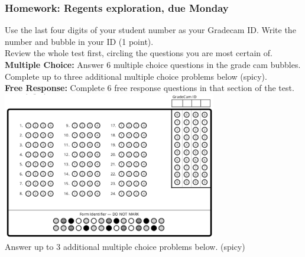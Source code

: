 \documentclass[12pt, twoside]{article}
\begin{document}
\subsubsection*{Homework: Regents exploration, due Monday}

Use the last four digits of your student number as your Gradecam ID. Write the number and bubble in your ID (1 point).\\[0.5cm]
Review the whole test first, circling the questions you are most certain of.\\[0.5cm]
\textbf{Multiple Choice: } Answer 6 multiple choice questions in the grade cam bubbles. Complete up to three additional multiple choice problems below (spicy).\\[0.5cm]
\textbf{Free Response: } Complete 6 free response questions in that section of the test. \\[0.5cm]

\includegraphics[width=0.7\textwidth]{gradecam-24.png} \\ \vspace{0.5cm}
Answer up to 3 additional multiple choice problems below. (spicy)
\end{document}
